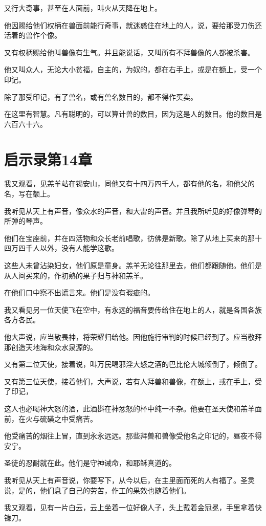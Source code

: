 \documentclass[12pt,oneside]{book}
\begin{document}
又行大奇事，甚至在人面前，叫火从天降在地上。

他因赐给他们权柄在兽面前能行奇事，就迷惑住在地上的人，说，要给那受刀伤还活着的兽作个像。

又有权柄赐给他叫兽像有生气。并且能说话，又叫所有不拜兽像的人都被杀害。

他又叫众人，无论大小贫福，自主的，为奴的，都在右手上，或是在额上，受一个印记。

除了那受印记，有了兽名，或有兽名数目的，都不得作买卖。

在这里有智慧。凡有聪明的，可以算计兽的数目，因为这是人的数目。他的数目是六百六十六。

\chapter{启示录第14章}
我又观看，见羔羊站在锡安山，同他又有十四万四千人，都有他的名，和他父的名，写在额上。

我听见从天上有声音，像众水的声音，和大雷的声音。并且我所听见的好像弹琴的所弹的琴声。

他们在宝座前，并在四活物和众长老前唱歌，彷佛是新歌。除了从地上买来的那十四万四千人以外，没有人能学这歌。

这些人未曾沾染妇女，他们原是童身。羔羊无论往那里去，他们都跟随他。他们是从人间买来的，作初熟的果子归与神和羔羊。

在他们口中察不出谎言来。他们是没有瑕疵的。

我又看见另一位天使飞在空中，有永远的福音要传给住在地上的人，就是各国各族各方各民。

他大声说，应当敬畏神，将荣耀归给他。因他施行审判的时候已经到了。应当敬拜那创造天地海和众水泉源的。

又有第二位天使，接着说，叫万民喝邪淫大怒之酒的巴比伦大城倾倒了，倾倒了。

又有第三位天使，接着他们，大声说，若有人拜兽和兽像，在额上，或在手上，受了印记，

这人也必喝神大怒的酒，此酒斟在神忿怒的杯中纯一不杂。他要在圣天使和羔羊面前，在火与硫磺之中受痛苦。

他受痛苦的烟往上冒，直到永永远远。那些拜兽和兽像受他名之印记的，昼夜不得安宁。

圣徒的忍耐就在此。他们是守神诫命，和耶稣真道的。

我听见从天上有声音说，你要写下，从今以后，在主里面而死的人有福了。圣灵说，是的，他们息了自己的劳苦，作工的果效也随着他们。

我又观看，见有一片白云，云上坐着一位好像人子，头上戴着金冠冕，手里拿着快镰刀。
\end{document}
